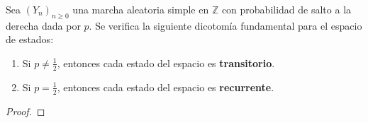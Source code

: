 \begin{teo}
    Sea $(Y_n)_{n \geq 0}$ una marcha aleatoria simple en $\mathbb{Z}$ con probabilidad de salto a la derecha dada por $p$. Se verifica la siguiente dicotomía fundamental para el espacio de estados:
    \begin{enumerate}
        \item Si $p \neq \frac{1}{2}$, entonces cada estado del espacio es \textbf{transitorio}.
        \item Si $p = \frac{1}{2}$, entonces cada estado del espacio es \textbf{recurrente}.
    \end{enumerate}

\begin{proof}




\end{proof}
\end{teo}

